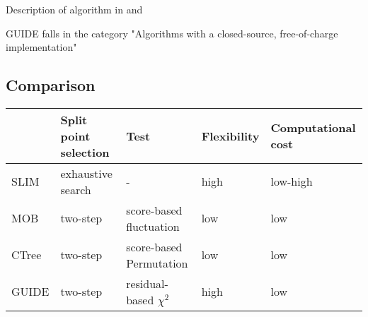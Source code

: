 Description of algorithm in \citep{Loh.2009} and \citep{.2002}

GUIDE falls in the category "Algorithms with a closed-source, free-of-charge implementation" \citep{Loh.2014}



\subsection{Comparison}
\begin{table}[ht]
\centering
\begin{tabular}{lllll}
  \hline
 & Split point selection & Test & Flexibility & Computational cost  \\ 
  \hline
    SLIM & exhaustive search & - & high & low-high  \\ 
    MOB & two-step & score-based fluctuation & low & low  \\ 
    CTree & two-step & score-based Permutation & low & low  \\ 
    GUIDE & two-step & residual-based $\chi^2$  & high & low  \\ 
   \hline
\end{tabular}
\end{table}
\citep{Schlosser.2019}


